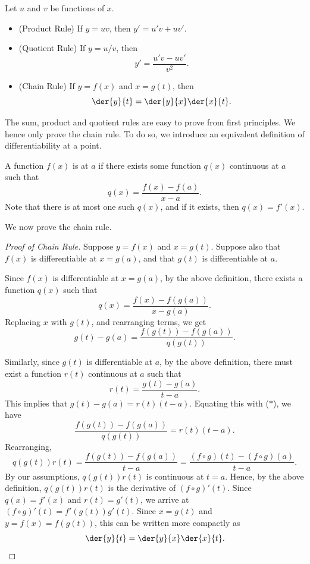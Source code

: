 \begin{proposition}
    Let $u$ and $v$ be functions of $x$.
    \begin{itemize}
        \item (Product Rule) If $y = uv$, then $y' = u' v + u v'$.
        \item (Quotient Rule) If $y = u/v$, then \[y' = \frac{u' v - u v'}{v^2}.\]
        \item (Chain Rule) If $y = f(x)$ and $x = g(t)$, then \[\der{y}{t} = \der{y}{x} \der{x}{t}.\]
    \end{itemize}
\end{proposition}
The sum, product and quotient rules are easy to prove from first principles. We hence only prove the chain rule. To do so, we introduce an equivalent definition of differentiability at a point.
\begin{definition}\label{def:Differentiability}
    A function $f(x)$ is  at $a$ if there exists some function $q(x)$ continuous at $a$ such that \[q(x) = \frac{f(x) - f(a)}{x - a}.\] Note that there is at most one such $q(x)$, and if it exists, then $q(x) = f'(x)$.
\end{definition}
We now prove the chain rule.
\begin{proof}[Proof of Chain Rule]    
    Suppose $y = f(x)$ and $x = g(t)$. Suppose also that $f(x)$ is differentiable at $x = g(a)$, and that $g(t)$ is differentiable at $a$.

    Since $f(x)$ is differentiable at $x = g(a)$, by the above definition, there exists a function $q(x)$ such that \[q(x) = \frac{f(x) - f(g(a))}{x - g(a)}.\] Replacing $x$ with $g(t)$, and rearranging terms, we get \[g(t) - g(a) = \frac{f(g(t)) - f(g(a))}{q(g(t))}. \tag{$\ast$}\]

    Similarly, since $g(t)$ is differentiable at $a$, by the above definition, there must exist a function $r(t)$ continuous at $a$ such that \[r(t) = \frac{g(t) - g(a)}{t - a}.\] This implies that $g(t) - g(a) = r(t) (t - a)$. Equating this with ($\ast$), we have \[\frac{f(g(t)) - f(g(a))}{q(g(t))} = r(t) (t - a).\] Rearranging, \[q(g(t)) r(t) = \frac{f(g(t)) - f(g(a))}{t - a} = \frac{(f \circ g)(t) - (f \circ g)(a)}{t - a}.\] By our assumptions, $q(g(t)) r(t)$ is continuous at $t = a$. Hence, by the above definition, $q(g(t)) r(t)$ is the derivative of $(f \circ g)'(t)$. Since $q(x) = f'(x)$ and $r(t) = g'(t)$, we arrive at $(f \circ g)'(t) = f'(g(t)) g'(t)$. Since $x = g(t)$ and $y = f(x) = f(g(t))$, this can be written more compactly as \[\der{y}{t} = \der{y}{x} \der{x}{t}.\]
\end{proof}

